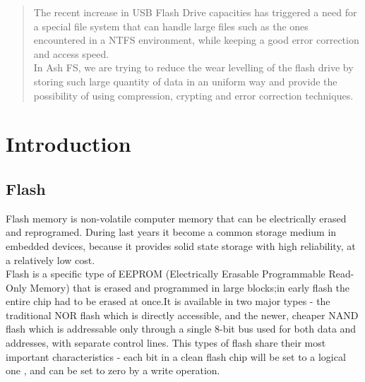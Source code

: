 \documentclass[conference]{IEEEtran}
\begin{document}
\begin{abstract}
The recent increase in USB Flash Drive capacities has triggered a need for a special
file system that can handle large files such as the ones encountered in a NTFS environment,
while keeping a good error correction and access speed.\\

In Ash FS, we are trying to reduce the wear levelling of the flash drive by storing such
large quantity of data in an uniform way and provide the possibility of using compression,
crypting and error correction techniques.\\

\end{abstract}


%

\section{Introduction}
\subsection{Flash}


Flash memory is non-volatile computer memory that can be electrically erased and reprogramed.
During last years it become a common storage medium in embedded devices, because it 
provides solid state storage with high reliability, at a relatively low cost.\\

Flash is a specific type of EEPROM (Electrically Erasable Programmable Read-Only Memory)
that is erased and programmed in large blocks;in early flash the entire chip had to be
erased at once.It is available in two major types - the traditional NOR flash which 
is directly accessible, and the newer, cheaper NAND flash which is addressable only 
through a single 8-bit bus used for both data and addresses, with separate control lines.
This types of flash share their most important characteristics - each bit in a clean 
flash chip will be set to a logical one , and can be set to zero by a write operation. \\
\end{document}
